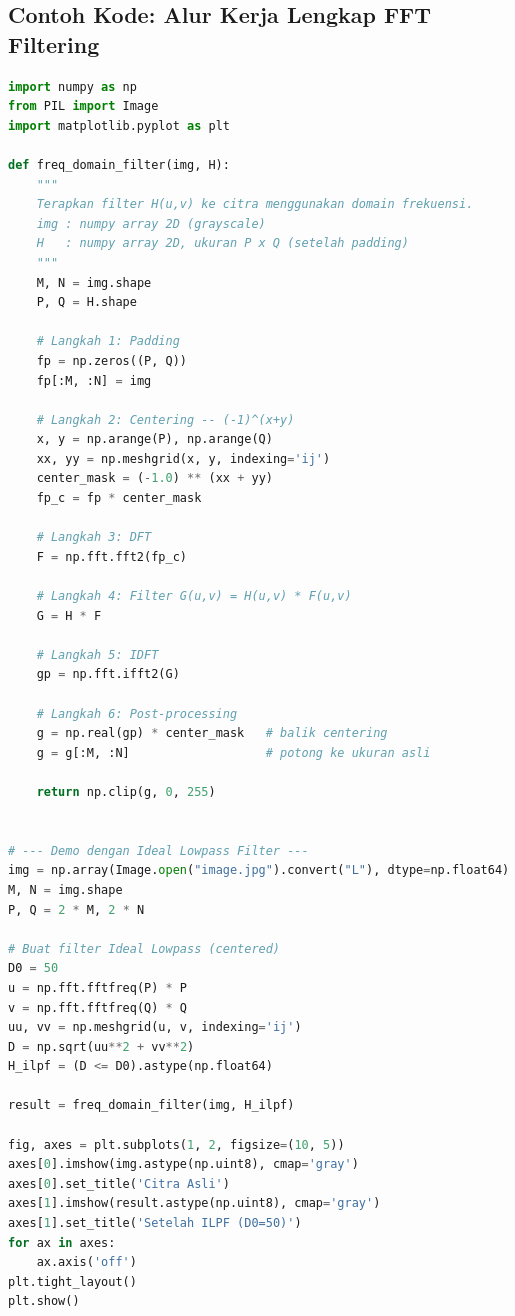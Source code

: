 \documentclass[12pt,a4paper]{article}
\begin{document}
\subsection{Contoh Kode: Alur Kerja Lengkap FFT Filtering}

\begin{lstlisting}[language=Python, caption={Alur kerja pemfilteran domain frekuensi (6 langkah)}]
import numpy as np
from PIL import Image
import matplotlib.pyplot as plt

def freq_domain_filter(img, H):
    """
    Terapkan filter H(u,v) ke citra menggunakan domain frekuensi.
    img : numpy array 2D (grayscale)
    H   : numpy array 2D, ukuran P x Q (setelah padding)
    """
    M, N = img.shape
    P, Q = H.shape

    # Langkah 1: Padding
    fp = np.zeros((P, Q))
    fp[:M, :N] = img

    # Langkah 2: Centering -- (-1)^(x+y)
    x, y = np.arange(P), np.arange(Q)
    xx, yy = np.meshgrid(x, y, indexing='ij')
    center_mask = (-1.0) ** (xx + yy)
    fp_c = fp * center_mask

    # Langkah 3: DFT
    F = np.fft.fft2(fp_c)

    # Langkah 4: Filter G(u,v) = H(u,v) * F(u,v)
    G = H * F

    # Langkah 5: IDFT
    gp = np.fft.ifft2(G)

    # Langkah 6: Post-processing
    g = np.real(gp) * center_mask   # balik centering
    g = g[:M, :N]                   # potong ke ukuran asli

    return np.clip(g, 0, 255)


# --- Demo dengan Ideal Lowpass Filter ---
img = np.array(Image.open("image.jpg").convert("L"), dtype=np.float64)
M, N = img.shape
P, Q = 2 * M, 2 * N

# Buat filter Ideal Lowpass (centered)
D0 = 50
u = np.fft.fftfreq(P) * P
v = np.fft.fftfreq(Q) * Q
uu, vv = np.meshgrid(u, v, indexing='ij')
D = np.sqrt(uu**2 + vv**2)
H_ilpf = (D <= D0).astype(np.float64)

result = freq_domain_filter(img, H_ilpf)

fig, axes = plt.subplots(1, 2, figsize=(10, 5))
axes[0].imshow(img.astype(np.uint8), cmap='gray')
axes[0].set_title('Citra Asli')
axes[1].imshow(result.astype(np.uint8), cmap='gray')
axes[1].set_title('Setelah ILPF (D0=50)')
for ax in axes:
    ax.axis('off')
plt.tight_layout()
plt.show()
\end{lstlisting}

\end{document}
